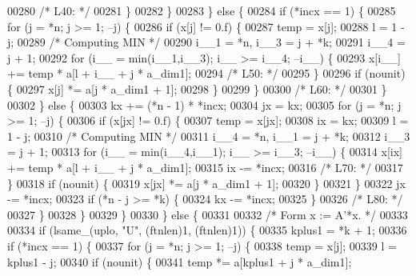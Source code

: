 \begin{DoxyCode}
00280 \textcolor{comment}{/* L40: */}
00281         \}
00282         \}
00283     \} \textcolor{keywordflow}{else} \{
00284         \textcolor{keywordflow}{if} (*incx == 1) \{
00285         \textcolor{keywordflow}{for} (j = *n; j >= 1; --j) \{
00286             \textcolor{keywordflow}{if} (x[j] != 0.f) \{
00287             temp = x[j];
00288             l = 1 - j;
00289 \textcolor{comment}{/* Computing MIN */}
00290             i\_\_1 = *n, i\_\_3 = j + *k;
00291             i\_\_4 = j + 1;
00292             \textcolor{keywordflow}{for} (i\_\_ = min(i\_\_1,i\_\_3); i\_\_ >= i\_\_4; --i\_\_) \{
00293                 x[i\_\_] += temp * a[l + i\_\_ + j * a\_dim1];
00294 \textcolor{comment}{/* L50: */}
00295             \}
00296             \textcolor{keywordflow}{if} (nounit) \{
00297                 x[j] *= a[j * a\_dim1 + 1];
00298             \}
00299             \}
00300 \textcolor{comment}{/* L60: */}
00301         \}
00302         \} \textcolor{keywordflow}{else} \{
00303         kx += (*n - 1) * *incx;
00304         jx = kx;
00305         \textcolor{keywordflow}{for} (j = *n; j >= 1; --j) \{
00306             \textcolor{keywordflow}{if} (x[jx] != 0.f) \{
00307             temp = x[jx];
00308             ix = kx;
00309             l = 1 - j;
00310 \textcolor{comment}{/* Computing MIN */}
00311             i\_\_4 = *n, i\_\_1 = j + *k;
00312             i\_\_3 = j + 1;
00313             \textcolor{keywordflow}{for} (i\_\_ = min(i\_\_4,i\_\_1); i\_\_ >= i\_\_3; --i\_\_) \{
00314                 x[ix] += temp * a[l + i\_\_ + j * a\_dim1];
00315                 ix -= *incx;
00316 \textcolor{comment}{/* L70: */}
00317             \}
00318             \textcolor{keywordflow}{if} (nounit) \{
00319                 x[jx] *= a[j * a\_dim1 + 1];
00320             \}
00321             \}
00322             jx -= *incx;
00323             \textcolor{keywordflow}{if} (*n - j >= *k) \{
00324             kx -= *incx;
00325             \}
00326 \textcolor{comment}{/* L80: */}
00327         \}
00328         \}
00329     \}
00330     \} \textcolor{keywordflow}{else} \{
00331 
00332 \textcolor{comment}{/*        Form  x := A'*x. */}
00333 
00334     \textcolor{keywordflow}{if} (lsame\_(uplo, \textcolor{stringliteral}{"U"}, (ftnlen)1, (ftnlen)1)) \{
00335         kplus1 = *k + 1;
00336         \textcolor{keywordflow}{if} (*incx == 1) \{
00337         \textcolor{keywordflow}{for} (j = *n; j >= 1; --j) \{
00338             temp = x[j];
00339             l = kplus1 - j;
00340             \textcolor{keywordflow}{if} (nounit) \{
00341             temp *= a[kplus1 + j * a\_dim1];

\end{DoxyCode}
